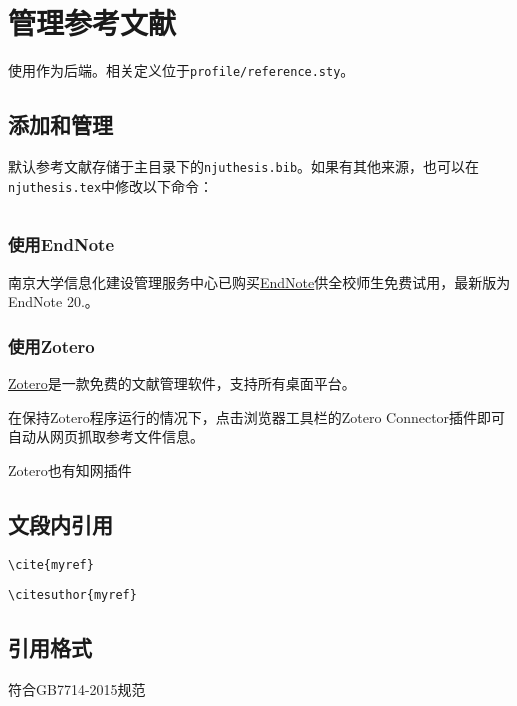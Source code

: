 \chapter{管理参考文献}
\label{chap:bibliography}


使用作为后端。相关定义位于\lstinline|profile/reference.sty|。

\section{添加和管理}

默认参考文献存储于主目录下的\lstinline|njuthesis.bib|。如果有其他来源，也可以在\lstinline|njuthesis.tex|中修改以下命令：
\begin{lstlisting}[language=TeX]

\end{lstlisting}

\subsection{使用EndNote}

南京大学信息化建设管理服务中心已购买\href{https://itsc.nju.edu.cn/EndNote/list.htm}{EndNote}供全校师生免费试用，最新版为EndNote 20.。

\subsection{使用Zotero}

\href{https://www.zotero.org/}{Zotero}是一款免费的文献管理软件，支持所有桌面平台。

在保持Zotero程序运行的情况下，点击浏览器工具栏的Zotero Connector插件即可自动从网页抓取参考文件信息。

Zotero也有知网插件

\section{文段内引用}

\lstinline|\cite{myref}|

\lstinline|\citesuthor{myref}|

\section{引用格式}

符合GB7714-2015规范
